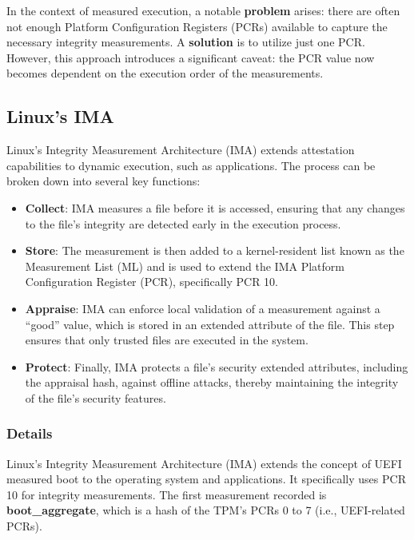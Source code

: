In the context of measured execution, a notable \textbf{problem} arises: there are often not enough Platform Configuration Registers (PCRs) available to capture the necessary integrity measurements. A \textbf{solution} is to utilize just one PCR. However, this approach introduces a significant caveat: the PCR value now becomes dependent on the execution order of the measurements.


\subsection{Linux's IMA }
Linux’s Integrity Measurement Architecture (IMA) extends attestation capabilities to dynamic execution, such as applications. The process can be broken down into several key functions:
\begin{itemize}[itemsep=0pt]
\item \textbf{Collect}: IMA measures a file before it is accessed, ensuring that any changes to the file's integrity are detected early in the execution process.

\item \textbf{Store}: The measurement is then added to a kernel-resident list known as the Measurement List (ML) and is used to extend the IMA Platform Configuration Register (PCR), specifically PCR 10.

\item  \textbf{Appraise}: IMA can enforce local validation of a measurement against a “good” value, which is stored in an extended attribute of the file. This step ensures that only trusted files are executed in the system.

\item \textbf{Protect}: Finally, IMA protects a file's security extended attributes, including the appraisal hash, against offline attacks, thereby maintaining the integrity of the file's security features.
\end{itemize}

\subsubsection{Details}

Linux's Integrity Measurement Architecture (IMA) extends the concept of UEFI measured boot to the operating system and applications. It specifically uses PCR 10 for integrity measurements. The first measurement recorded is \textbf{boot\_aggregate}, which is a hash of the TPM’s PCRs 0 to 7 (i.e., UEFI-related PCRs). 

